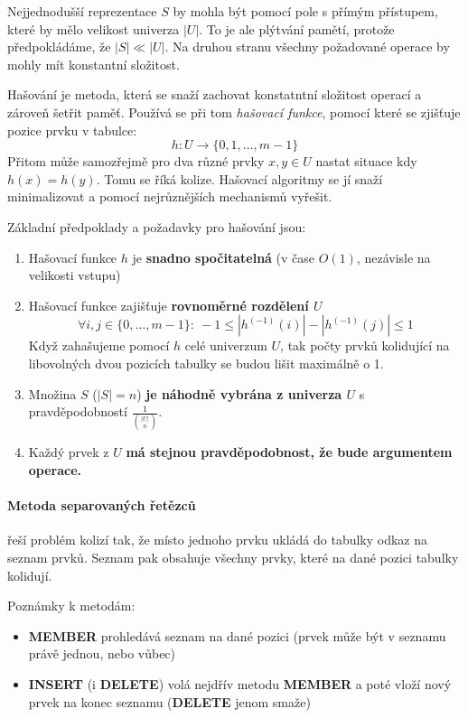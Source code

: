 \documentclass[a4paper]{article}      %
\begin{document}
Nejjednodušší reprezentace $S$ by mohla být pomocí pole s přímým přístupem, které by mělo velikost univerza $|U|$. To je ale plýtvání pamětí, protože předpokládáme, že $|S| \ll |U|$. Na druhou stranu všechny požadované operace by mohly mít konstantní složitost.

Hašování je metoda, která se snaží zachovat konstatntní složitost operací a zároveň šetřit paměť.
Používá se při tom \emph{hašovací funkce}, pomocí které se zjišťuje pozice prvku v tabulce:
\[h: U \rightarrow \lbrace 0, 1, \ldots, m-1 \rbrace\]
Přitom může samozřejmě pro dva různé prvky $x,y \in U$ nastat situace kdy $h(x) = h(y)$. Tomu se říká kolize.
Hašovací algoritmy se jí snaží minimalizovat a pomocí nejrůznějších mechanismů vyřešit.

Základní předpoklady a požadavky pro hašování jsou:
\begin{enumerate}
\item Hašovací funkce $h$ je \textbf{snadno spočitatelná} (v čase $O(1)$, nezávisle na velikosti vstupu)
\item Hašovací funkce zajišťuje \textbf{rovnoměrné rozdělení $U$}
\[
\forall i,j \in \lbrace 0, \ldots, m-1\rbrace:\ -1 \leq |h^{(-1)}(i)| - |h^{(-1)}(j)| \leq 1
\]
Když zahašujeme pomocí $h$ celé univerzum $U$, tak počty prvků kolidující na libovolných dvou pozicích tabulky se budou lišit maximálně o 1.
\item Množina \textbf{$S$} ($|S|=n$) \textbf{je náhodně vybrána z univerza $U$} s pravděpodobností $\frac{1}{{|U|\choose n}}$.
\item Každý prvek z $U$ \textbf{má stejnou pravděpodobnost, že bude argumentem operace.} 
\end{enumerate}

\paragraph{Metoda separovaných řetězců} řeší problém kolizí tak, že místo jednoho prvku ukládá do tabulky odkaz na seznam prvků.
Seznam pak obsahuje všechny prvky, které na dané pozici tabulky kolidují.

Poznámky k metodám:
\begin{itemize}
\item \textbf{MEMBER} prohledává seznam na dané pozici (prvek může být v seznamu právě jednou, nebo vůbec)
\item \textbf{INSERT} (i \textbf{DELETE}) volá nejdřív metodu \textbf{MEMBER} a poté vloží nový prvek na konec seznamu (\textbf{DELETE} jenom smaže) 
\end{itemize}
\end{document}
